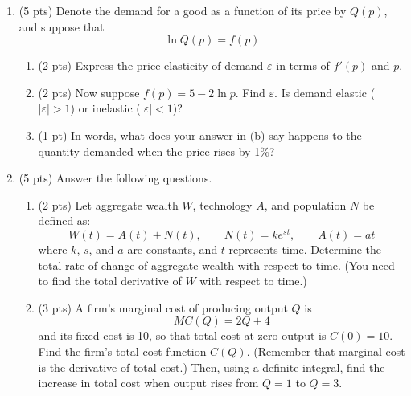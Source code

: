 \documentclass{./../../latex/tests}
\begin{document}
\begin{enumerate}
\newpage
\item (5 pts) Denote the demand for a good as a function of its price by $Q(p)$, and suppose that
\[ \ln Q(p) = f(p) \]
\begin{enumerate}
\item (2 pts) Express the price elasticity of demand $\varepsilon$ in terms of $f'(p)$ and $p$.
\vspace{6cm}
\item (2 pts) Now suppose $f(p) = 5 - 2 \ln p$. Find $\varepsilon$. Is demand elastic ($|\varepsilon| > 1$) or inelastic ($|\varepsilon| < 1$)?
\vspace{5cm}
\item (1 pt) In words, what does your answer in (b) say happens to the quantity demanded when the price rises by 1\%?
\end{enumerate}

\newpage
\item (5 pts) Answer the following questions.
\begin{enumerate}
\item (2 pts) Let aggregate wealth $W$, technology $A$, and population $N$ be defined as:
\[ W(t) = A(t) + N(t), \qquad N(t) = k e^{st}, \qquad A(t) = at \]
where $k$, $s$, and $a$ are constants, and $t$ represents time. Determine the total rate of change of aggregate wealth with respect to time. (You need to find the total derivative of $W$ with respect to time.)
\vspace{6.5cm}
\item (3 pts) A firm's marginal cost of producing output $Q$ is
\[ MC(Q) = 2Q + 4 \]
and its fixed cost is 10, so that total cost at zero output is $C(0) = 10$. Find the firm's total cost function $C(Q)$. (Remember that marginal cost is the derivative of total cost.) Then, using a definite integral, find the increase in total cost when output rises from $Q = 1$ to $Q = 3$.
\end{enumerate}

\end{enumerate}
\end{document}

